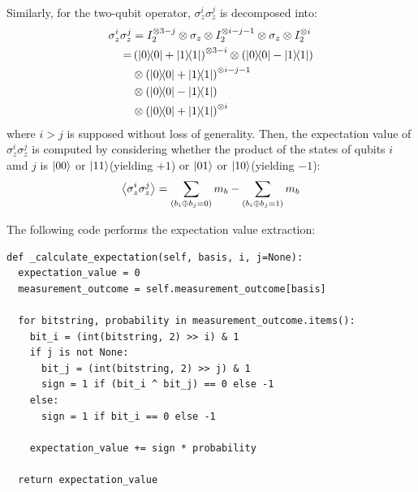 \documentclass[a4paper, 11pt]{article}
\begin{document}
Similarly, for the two-qubit operator, $\sigma_{z}^{i}\sigma_{z}^{j}$ is decomposed into:
\begin{align*}
  \sigma_{z}^{i}\sigma_{z}^{j} &= I_{2}^{\otimes 3-j} \otimes \sigma_z \otimes I_{2}^{\otimes i-j-1} \otimes \sigma_{z} \otimes I_{2}^{\otimes i} \\
  =&  \left(\ketbra{0} + \ketbra{1}\right)^{\otimes 3-i} \otimes \left(\ketbra{0} - \ketbra{1}\right) \\
  & \otimes \left(\ketbra{0} + \ketbra{1}\right)^{\otimes i-j-1}  \\
  & \otimes \left(\ketbra{0} - \ketbra{1}\right) \\
  & \otimes \left(\ketbra{0} + \ketbra{1}\right)^{\otimes i} 
\end{align*}
where $i>j$ is supposed without loss of generality. 
Then, the expectation value of $\sigma_{z}^{i}\sigma_{z}^{j} $ is computed by considering whether the product of the states of qubits $i$ amd $j$ is $\ket{00}$ or $\ket{11}$(yielding $+1$) or $\ket{01}$ or $\ket{10}$(yielding $-1$):
\begin{equation}
  \expectationvalue{\sigma_{z}^{i}\sigma_{z}^{j}} = \sum_{(b_{i}\oplus b_{j} = 0)} m_{b} - \sum_{(b_{i}\oplus b_{j}  = 1)} m_{b}
\end{equation}

The following code performs the expectation value extraction: 
\begin{verbatim}
def _calculate_expectation(self, basis, i, j=None):
  expectation_value = 0
  measurement_outcome = self.measurement_outcome[basis]

  for bitstring, probability in measurement_outcome.items():
    bit_i = (int(bitstring, 2) >> i) & 1
    if j is not None:
      bit_j = (int(bitstring, 2) >> j) & 1
      sign = 1 if (bit_i ^ bit_j) == 0 else -1
    else:
      sign = 1 if bit_i == 0 else -1

    expectation_value += sign * probability

  return expectation_value
\end{verbatim}
\end{document}
